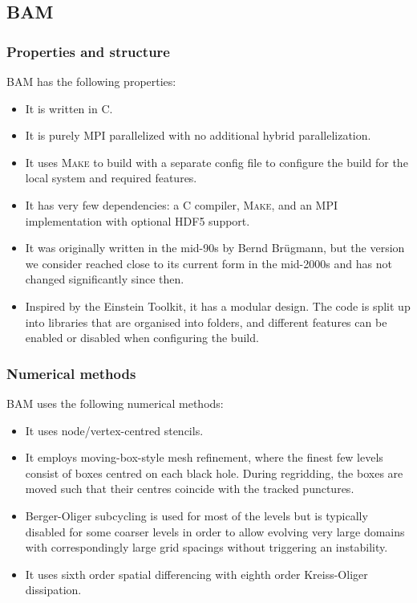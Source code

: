 \documentclass[12pt,a4paper]{article}
\numberwithin{figure}{subsection}
\newcommand{\bam}{\textsc{BAM}\xspace}
\begin{document}
\subsection{BAM}

\subsubsection{Properties and structure}
\bam has the following properties:
\begin{itemize}
    \item It is written in C.
    \item It is purely MPI parallelized with no additional hybrid
    parallelization.
    \item It uses \textsc{Make} to build with a separate config file to
    configure the build for the local system and required features.
    \item It has very few dependencies: a C compiler, \textsc{Make}, and an MPI
    implementation with optional HDF5 support.
    \item It was originally written in the mid-90s by Bernd Br\"ugmann, but the
    version we consider reached close to its current form in the mid-2000s and
    has not changed significantly since then.
    \item Inspired by the Einstein Toolkit, it has a modular design. The code is
    split up into libraries that are organised into folders, and different
    features can be enabled or disabled when configuring the build.
\end{itemize}

\subsubsection{Numerical methods}
\bam uses the following numerical methods:
\begin{itemize}
    \item It uses node/vertex-centred stencils.
    \item It employs moving-box-style mesh refinement, where the finest few
    levels consist of boxes centred on each black hole. During regridding, the
    boxes are moved such that their centres coincide with the tracked punctures.
    \item Berger-Oliger subcycling \cite{Berger:1984zza} is used for most of the
    levels but is typically disabled for some coarser levels in order to allow
    evolving very large domains with correspondingly large grid spacings without
    triggering an instability.
    \item It uses sixth order spatial differencing with eighth order
    Kreiss-Oliger dissipation.
\end{itemize}
\end{document}

